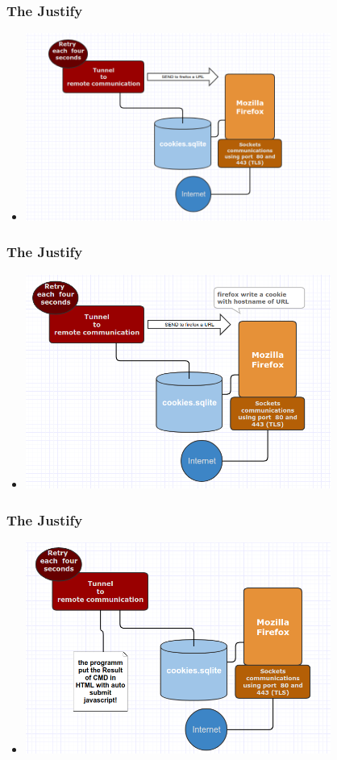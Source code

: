 \documentclass[serif,mathserif]{beamer}
\begin{document}
\begin{frame}
  \frametitle{The Justify}
  \begin{itemize}
  \item \includegraphics[width=10.0cm]{img/tunnel2.png}
  \end{itemize}
\end{frame}

\begin{frame}
  \frametitle{The Justify}
  \begin{itemize}
  \item \includegraphics[width=10.0cm]{img/tunnel4.png}
  \end{itemize}
\end{frame}

\begin{frame}
  \frametitle{The Justify}
  \begin{itemize}
  \item \includegraphics[width=10.0cm]{img/tunnel6.png}
  \end{itemize}
\end{frame}
\end{document}
